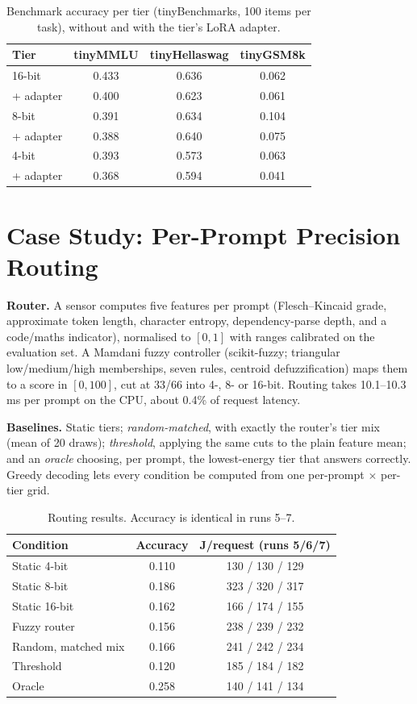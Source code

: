 \documentclass[conference]{IEEEtran}
\begin{document}
\begin{table}[t]
\caption{Benchmark accuracy per tier (tinyBenchmarks, 100 items per task), without and with the tier's LoRA adapter.}
\label{tab:acc}
\centering\small
\begin{tabular}{lccc}
\toprule
Tier & tinyMMLU & tinyHellaswag & tinyGSM8k \\
\midrule
16-bit & 0.433 & 0.636 & 0.062 \\
\quad + adapter & 0.400 & 0.623 & 0.061 \\
8-bit & 0.391 & 0.634 & 0.104 \\
\quad + adapter & 0.388 & 0.640 & 0.075 \\
4-bit & 0.393 & 0.573 & 0.063 \\
\quad + adapter & 0.368 & 0.594 & 0.041 \\
\bottomrule
\end{tabular}
\end{table}

\section{Case Study: Per-Prompt Precision Routing}
\label{sec:routing}
\textbf{Router.} A sensor computes five features per prompt (Flesch--Kincaid grade, approximate token length, character entropy, dependency-parse depth, and a code/maths indicator), normalised to $[0,1]$ with ranges calibrated on the evaluation set. A Mamdani fuzzy controller (scikit-fuzzy; triangular low/medium/high memberships, seven rules, centroid defuzzification) maps them to a score in $[0,100]$, cut at 33/66 into 4-, 8- or 16-bit. Routing takes 10.1--10.3\,ms per prompt on the CPU, about 0.4\% of request latency.

\textbf{Baselines.} Static tiers; \emph{random-matched}, with exactly the router's tier mix (mean of 20 draws); \emph{threshold}, applying the same cuts to the plain feature mean; and an \emph{oracle} choosing, per prompt, the lowest-energy tier that answers correctly. Greedy decoding lets every condition be computed from one per-prompt $\times$ per-tier grid.

\begin{table}[t]
\caption{Routing results. Accuracy is identical in runs 5--7.}
\label{tab:routing}
\centering\small
\begin{tabular}{lcc}
\toprule
Condition & Accuracy & J/request (runs 5/6/7) \\
\midrule
Static 4-bit & 0.110 & 130 / 130 / 129 \\
Static 8-bit & 0.186 & 323 / 320 / 317 \\
Static 16-bit & 0.162 & 166 / 174 / 155 \\
Fuzzy router & 0.156 & 238 / 239 / 232 \\
Random, matched mix & 0.166 & 241 / 242 / 234 \\
Threshold & 0.120 & 185 / 184 / 182 \\
Oracle & 0.258 & 140 / 141 / 134 \\
\bottomrule
\end{tabular}
\end{table}
\end{document}
